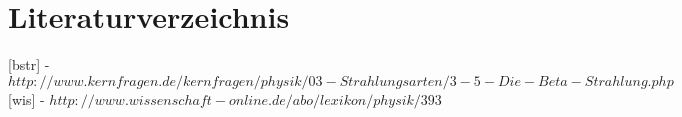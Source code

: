 \clearpage
\section{Literaturverzeichnis}
[bstr] - $http://www.kernfragen.de/kernfragen/physik/03-Strahlungsarten/3-5-Die-Beta-Strahlung.php$
[wis] - $http://www.wissenschaft-online.de/abo/lexikon/physik/393$ 